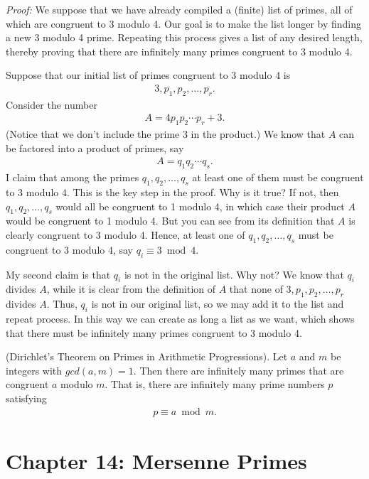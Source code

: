 \documentclass[graybox]{svmult}
\begin{document}
\textit{Proof:} We suppose that we have already compiled a (finite) list of primes, all of which are congruent to 3 modulo 4. Our goal is to make the list longer by finding a new 3 modulo 4 prime. Repeating this process gives a list of any desired length, thereby proving that there are infinitely many primes congruent to 3 modulo 4.

Suppose that our initial list of primes congruent to 3 modulo 4 is 
\begin{align*}
3,p_1,p_2,\ldots,p_r.
\end{align*}
Consider the number
\begin{align*}
A = 4p_1p_2\cdots p_r +3.
\end{align*}
(Notice that we don't include the prime 3 in the product.) We know that $A$ can be factored into a product of primes, say
\begin{align*}
A = q_1q_2\cdots q_s.
\end{align*}
I claim that among the primes $q_1, q_2, \ldots, q_s$ at least one of them must be congruent to 3 modulo 4. This is the key step in the proof. Why is it true? If not, then $q_1, q_2, \ldots, q_s$ would all be congruent to 1 modulo 4, in which case their product $A$ would be congruent to 1 modulo 4. But you can see from its definition that $A$ is clearly congruent to 3 modulo 4. Hence, at least one of $q_1, q_2, \ldots, q_s$ must be congruent to 3 modulo 4, say $q_i \equiv 3 \bmod 4$.

My second claim is that $q_i$ is not in the original list. Why not? We know that $q_i$ divides $A$, while it is clear from the definition of $A$ that none of $3, p_1, p_2, \ldots, p_r$ divides $A$. Thus, $q_i$ is not in our original list, so we may add it to the list and repeat process. In this way we can create as long a list as we want, which shows that there must be infinitely many primes congruent to 3 modulo 4.

\begin{theorem}
(Dirichlet's Theorem on Primes in Arithmetic Progressions). Let $a$ and $m$ be integers with $gcd(a, m)= 1$. Then there are infinitely many primes that are congruent $a$ modulo $m$. That is, there are infinitely many prime numbers $p$ satisfying
\begin{align*}
p \equiv a \bmod m.
\end{align*}
\end{theorem}

\section*{Chapter 14: Mersenne Primes}
\end{document}
